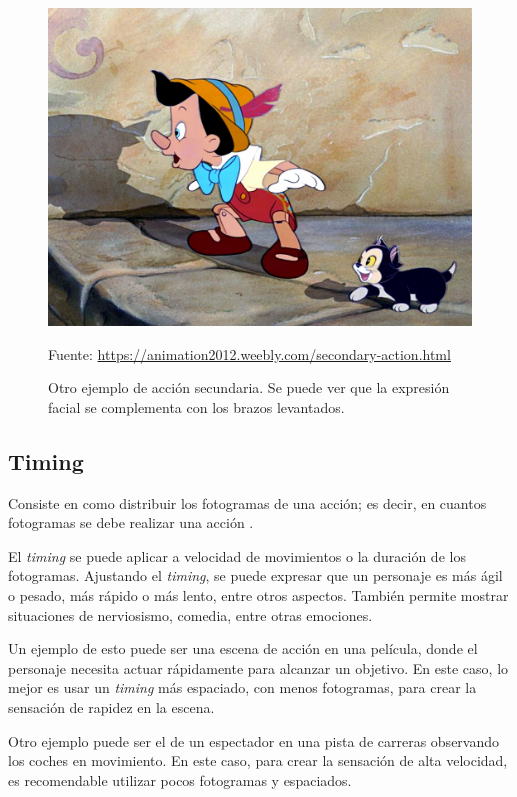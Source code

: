 \documentclass{article}
\begin{document}
\begin{figure}[H]
    \centering
    \includegraphics[width=\textwidth]{imagenes/sec-ac.jpg}
    \caption{Otro ejemplo de acción secundaria. Se puede ver que la expresión facial se complementa con los brazos levantados.}
    \vspace{10pt}
    \footnotesize{Fuente: \url{https://animation2012.weebly.com/secondary-action.html}}
\end{figure}
\subsection{Timing}

Consiste en como distribuir los fotogramas de una acción; es decir, en cuantos fotogramas se debe realizar una acción \cite{idearocket}.

\bigskip

El \textit{timing} se puede aplicar a velocidad de movimientos o la duración de los fotogramas. Ajustando el \textit{timing}, se puede expresar que un personaje es más ágil o pesado, más rápido o más lento, entre otros aspectos. También permite mostrar situaciones de nerviosismo, comedia, entre otras emociones.

\bigskip

Un ejemplo de esto puede ser una escena de acción en una película, donde el personaje necesita actuar rápidamente para alcanzar un objetivo. En este caso, lo mejor es usar un \textit{timing} más espaciado, con menos fotogramas, para crear la sensación de rapidez en la escena. 

Otro ejemplo puede ser el de un espectador en una pista de carreras observando los coches en movimiento. En este caso, para crear la sensación de alta velocidad, es recomendable utilizar pocos fotogramas y espaciados.
\end{document}
